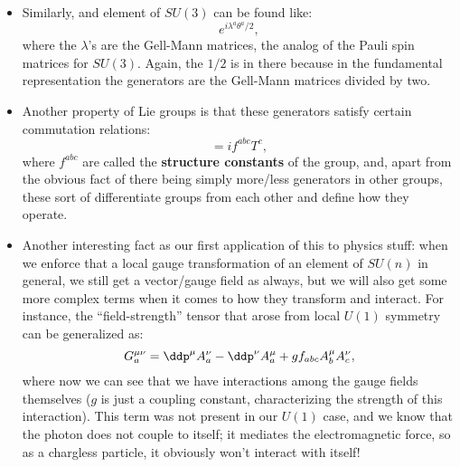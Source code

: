 \begin{itemize}
    \item Similarly, and element of $SU(3)$ can be found like:
        \begin{equation*}
            e^{i\lambda^a\theta^a/2},
        \end{equation*}
        where the $\lambda$'s are the Gell-Mann matrices, the analog of the Pauli spin matrices for $SU(3)$. Again, the $1/2$ is in there because in the fundamental representation the generators are the Gell-Mann matrices divided by two.
    \item Another property of Lie groups is that these generators satisfy certain commutation relations:
        \begin{equation*}
            [T^a,T^a] = if^{abc}T^c,
        \end{equation*}
        where $f^{abc}$ are called the \textbf{structure constants} of the group, and, apart from the obvious fact of there being simply more/less generators in other groups, these sort of differentiate groups from each other and define how they operate.
    \item Another interesting fact as our first application of this to physics stuff: when we enforce that a local gauge transformation of an element of $SU(n)$ in general, we still get a vector/gauge field as always, but we will also get some more complex terms when it comes to how they transform and interact. For instance, the ``field-strength'' tensor that arose from local $U(1)$ symmetry can be generalized as:
        \begin{equation*}
            G^{\mu\nu}_a = \ddp^{\mu}A^{\nu}_a - \ddp^{\nu}A^{\mu}_a + gf_{abc}A^{\mu}_bA^{\nu}_c,
        \end{equation*}
        where now we can see that we have interactions among the gauge fields themselves ($g$ is just a coupling constant, characterizing the strength of this interaction). This term was not present in our $U(1)$ case, and we know that the photon does not couple to itself; it mediates the electromagnetic force, so as a chargless particle, it obviously won't interact with itself!
\end{itemize}
